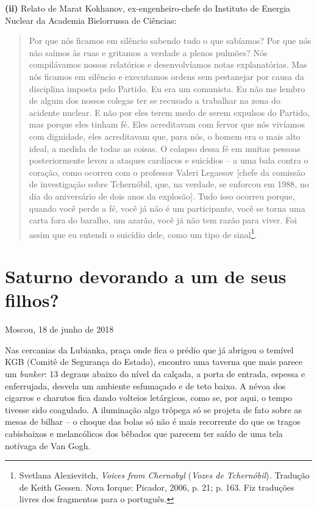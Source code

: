 \textbf{(ii)} Relato de Marat Kokhanov, ex-engenheiro-chefe do Instituto
de Energia Nuclear da Academia Bielorrussa de Ciências:

\begin{quote}
Por que nós ficamos em silêncio sabendo tudo o que sabíamos? Por que nós
não saímos às ruas e gritamos a verdade a plenos pulmões? Nós
compilávamos nossos relatórios e desenvolvíamos notas explanatórias. Mas
nós ficamos em silêncio e executamos ordens sem pestanejar por causa da
disciplina imposta pelo Partido. Eu era um comunista. Eu não me lembro
de algum dos nossos colegas ter se recusado a trabalhar na zona do
acidente nuclear. E não por eles terem medo de serem expulsos do
Partido, mas porque eles tinham fé. Eles acreditavam com fervor que nós
vivíamos com dignidade, eles acreditavam que, para nós, o homem era o
mais alto ideal, a medida de todas as coisas. O colapso dessa fé em
muitas pessoas posteriormente levou a ataques cardíacos e suicídios -- a
uma bala contra o coração, como ocorreu com o professor Valeri Legassov
{[}chefe da comissão de investigação sobre Tchernóbil, que, na verdade,
se enforcou em 1988, no dia do aniversário de dois anos da explosão{]}.
Tudo isso ocorreu porque, quando você perde a fé, você já não é um
participante, você se torna uma carta fora do baralho, um azarão, você
já não tem razão para viver. Foi assim que eu entendi o suicídio dele,
como um tipo de sinal\footnote{Svetlana Alexievitch, \emph{Voices from
  Chernobyl} (\emph{Vozes de Tchernóbil})\emph{.} Tradução de Keith
  Gessen. Nova Iorque: Picador, 2006, p. 21; p. 163. Fiz traduções
  livres dos fragmentos para o português.}.
\end{quote}

\chapter*{Saturno devorando a um de seus filhos?}

\begin{flushright}
Moscou, 18 de junho de 2018
\end{flushright}

Nas cercanias da Lubianka, praça onde fica o prédio que já abrigou o
temível KGB (Comitê de Segurança do Estado), encontro uma taverna que
mais parece um \emph{bunker}: 13 degraus abaixo do nível da calçada, a
porta de entrada, espessa e enferrujada, desvela um ambiente esfumaçado
e de teto baixo. A névoa dos cigarros e charutos fica dando volteios
letárgicos, como se, por aqui, o tempo tivesse sido coagulado. A
iluminação algo trôpega só se projeta de fato sobre as mesas de bilhar
-- o choque das bolas só não é mais recorrente do que os tragos
cabisbaixos e melancólicos dos bêbados que parecem ter saído de uma tela
notívaga de Van Gogh.

